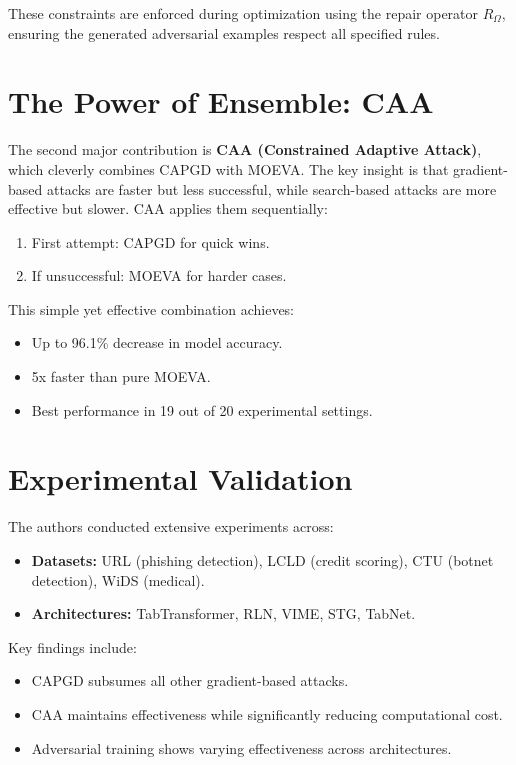 \documentclass{article}
\begin{document}
These constraints are enforced during optimization using the repair operator $R_{\Omega}$, ensuring the generated adversarial examples respect all specified rules.

\section*{The Power of Ensemble: CAA}

The second major contribution is \textbf{CAA (Constrained Adaptive Attack)}, which cleverly combines CAPGD with MOEVA. The key insight is that gradient-based attacks are faster but less successful, while search-based attacks are more effective but slower. CAA applies them sequentially:
\begin{enumerate}
    \item First attempt: CAPGD for quick wins.
    \item If unsuccessful: MOEVA for harder cases.
\end{enumerate}

This simple yet effective combination achieves:
\begin{itemize}
    \item Up to 96.1\% decrease in model accuracy.
    \item 5x faster than pure MOEVA.
    \item Best performance in 19 out of 20 experimental settings.
\end{itemize}

\section*{Experimental Validation}

The authors conducted extensive experiments across:
\begin{itemize}
    \item \textbf{Datasets:} URL (phishing detection), LCLD (credit scoring), CTU (botnet detection), WiDS (medical).
    \item \textbf{Architectures:} TabTransformer, RLN, VIME, STG, TabNet.
\end{itemize}

Key findings include:
\begin{itemize}
    \item CAPGD subsumes all other gradient-based attacks.
    \item CAA maintains effectiveness while significantly reducing computational cost.
    \item Adversarial training shows varying effectiveness across architectures.
\end{itemize}
\end{document}
